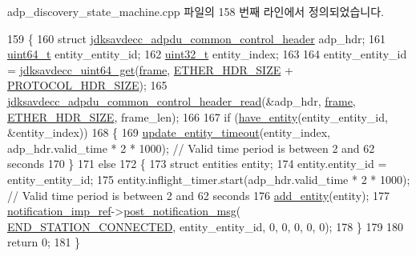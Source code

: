 adp\+\_\+discovery\+\_\+state\+\_\+machine.\+cpp 파일의 158 번째 라인에서 정의되었습니다.


\begin{DoxyCode}
159 \{
160     \textcolor{keyword}{struct }\hyperlink{structjdksavdecc__adpdu__common__control__header}{jdksavdecc\_adpdu\_common\_control\_header} adp\_hdr;
161     \hyperlink{parse_8c_aec6fcb673ff035718c238c8c9d544c47}{uint64\_t} entity\_entity\_id;
162     \hyperlink{parse_8c_a6eb1e68cc391dd753bc8ce896dbb8315}{uint32\_t} entity\_index;
163 
164     entity\_entity\_id = \hyperlink{group__endian_gac8c2b48b7d7db101708e0197e366ac42}{jdksavdecc\_uint64\_get}(\hyperlink{gst__avb__playbin_8c_ac8e710e0b5e994c0545d75d69868c6f0}{frame}, 
      \hyperlink{namespaceavdecc__lib_a6c827b1a0d973e18119c5e3da518e65ca9512ad9b34302ba7048d88197e0a2dc0}{ETHER\_HDR\_SIZE} + \hyperlink{namespaceavdecc__lib_afbe15cecee5d58e1587deaeee0f927daaca413724c7efb47f13b5f929e582d8cc}{PROTOCOL\_HDR\_SIZE});
165     \hyperlink{group__adpdu_gaa014d2ff90974366a024dac5a4f04cac}{jdksavdecc\_adpdu\_common\_control\_header\_read}(&adp\_hdr, 
      \hyperlink{gst__avb__playbin_8c_ac8e710e0b5e994c0545d75d69868c6f0}{frame}, \hyperlink{namespaceavdecc__lib_a6c827b1a0d973e18119c5e3da518e65ca9512ad9b34302ba7048d88197e0a2dc0}{ETHER\_HDR\_SIZE}, frame\_len);
166 
167     \textcolor{keywordflow}{if} (\hyperlink{classavdecc__lib_1_1adp__discovery__state__machine_a6c007eda13cfcbde481d090a7f7d61d2}{have\_entity}(entity\_entity\_id, &entity\_index))
168     \{
169         \hyperlink{classavdecc__lib_1_1adp__discovery__state__machine_a4a6c26ae852a2853703a9acf369b96bd}{update\_entity\_timeout}(entity\_index, adp\_hdr.valid\_time * 2 * 1000); \textcolor{comment}{// Valid
       time period is between 2 and 62 seconds}
170     \}
171     \textcolor{keywordflow}{else}
172     \{
173         \textcolor{keyword}{struct }entities entity;
174         entity.entity\_id = entity\_entity\_id;
175         entity.inflight\_timer.start(adp\_hdr.valid\_time * 2 * 1000); \textcolor{comment}{// Valid time period is between 2 and
       62 seconds}
176         \hyperlink{classavdecc__lib_1_1adp__discovery__state__machine_aaa476a159da4bd3ba5c5a118b9179635}{add\_entity}(entity);
177         \hyperlink{namespaceavdecc__lib_aca078f7550e970a17b3f732c26bc3d83}{notification\_imp\_ref}->\hyperlink{classavdecc__lib_1_1notification_a2775ca78354ea78d68bf107c084b3822}{post\_notification\_msg}(
      \hyperlink{namespaceavdecc__lib_ad2a3e740ca3019cf9fd0f9514afb6419ad4731d551a9e3c927e75510fb78cbafb}{END\_STATION\_CONNECTED}, entity\_entity\_id, 0, 0, 0, 0, 0);
178     \}
179 
180     \textcolor{keywordflow}{return} 0;
181 \}
\end{DoxyCode}


